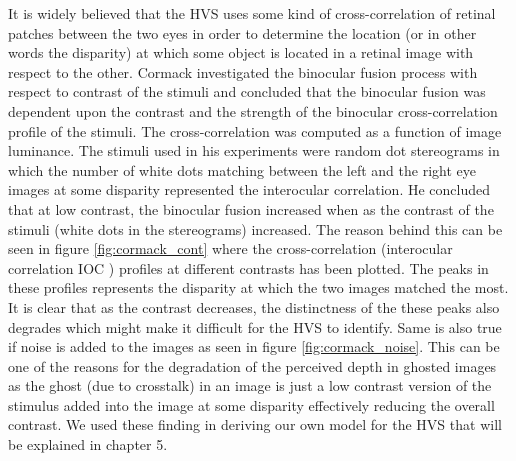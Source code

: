 It is widely believed that the HVS uses some kind of cross-correlation of retinal patches between the two eyes in order to determine the location (or in other words the disparity) at which some object is located in a retinal image with respect to the other. Cormack \cite{cormack1991interocular} investigated the binocular fusion process with respect to contrast of the stimuli and concluded that the binocular fusion was dependent upon the contrast and the strength of the binocular cross-correlation profile of the stimuli. The cross-correlation was computed as a function of image luminance. The stimuli used in his experiments were random dot stereograms in which the number of white dots matching between the left and the right eye images at some disparity represented the interocular correlation. He concluded that at low contrast, the binocular fusion increased when as the contrast of the stimuli (white dots in the stereograms) increased. The reason behind this can be seen in figure \ref{fig:cormack_cont} where the cross-correlation (interocular correlation IOC ) profiles at different contrasts has been plotted. The peaks in these profiles represents the disparity at which the two images matched the most. It is clear that as the contrast decreases, the distinctness of the these peaks also degrades which might make it difficult for the HVS to identify. Same is also true if noise is added to the images as seen in figure \ref{fig:cormack_noise}. This can be one of the reasons for the degradation of the perceived depth in ghosted images as the ghost (due to crosstalk) in an image is just a low contrast version of the stimulus added into the image at some disparity effectively reducing the overall contrast. We used these finding in deriving our own model for the HVS that will be explained in chapter 5.

